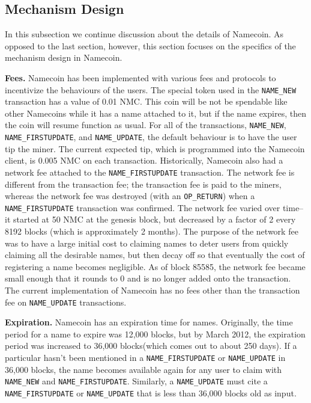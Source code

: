 \subsection{Mechanism Design}

In this subsection we continue discussion about the details of Namecoin. As opposed to the last section, however, this section focuses on the specifics of the mechanism design in Namecoin. 

{\bf Fees.}
Namecoin has been implemented with various fees and protocols to incentivize the behaviours of the users. The special token used in the {\tt NAME\_NEW} transaction has a value of 0.01 NMC. This coin will be not be spendable like other Namecoins while it has a name attached to it, but if the name expires, then the coin will resume function as usual. For all of the transactions, {\tt NAME\_NEW}, {\tt NAME\_FIRSTUPDATE}, and {\tt NAME\_UPDATE}, the default behaviour is to have the user tip the miner. The current expected tip, which is programmed into the Namecoin client, is 0.005 NMC on each transaction. Historically, Namecoin also had a network fee attached to the {\tt NAME\_FIRSTUPDATE} transaction. The network fee is different from the transaction fee; the transaction fee is paid to the miners, whereas the network fee was destroyed (with an {\tt OP\_RETURN}) when a {\tt NAME\_FIRSTUPDATE} transaction was confirmed. The network fee varied over time-- it started at 50 NMC at the genesis block, but decreased by a factor of 2 every 8192 blocks (which is approximately 2 months). The purpose of the network fee was to have a large initial cost to claiming names to deter users from quickly claiming all the desirable names, but then decay off so that eventually the cost of registering a name becomes negligible. As of block 85585, the network fee became small enough that it rounds to 0 and is no longer added onto the transaction. The current implementation of Namecoin has no fees other than the transaction fee on {\tt NAME\_UPDATE} transactions.

{\bf Expiration.}
Namecoin has an expiration time for names. Originally, the time period for a name to expire was 12,000 blocks, but by March 2012, the expiration period was increased to 36,000 blocks(which comes out to about 250 days). If a particular  hasn't been mentioned in a {\tt NAME\_FIRSTUPDATE} or {\tt NAME\_UPDATE} in 36,000 blocks, the name becomes available again for any user to claim with {\tt NAME\_NEW} and {\tt NAME\_FIRSTUPDATE}. Similarly, a {\tt NAME\_UPDATE} must cite a {\tt NAME\_FIRSTUPDATE} or {\tt NAME\_UPDATE} that is less than 36,000 blocks old as input.

